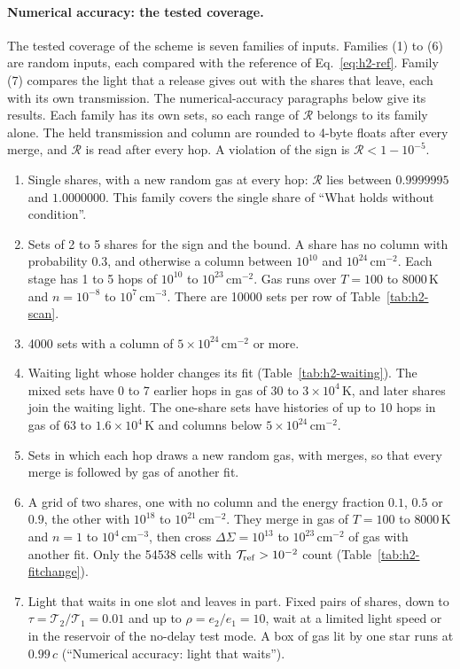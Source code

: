 \paragraph{Numerical accuracy: the tested coverage.} The tested coverage of the
scheme is seven families of inputs. Families (1) to (6) are random inputs,
each compared with the reference of Eq.~\eqref{eq:h2-ref}. Family (7)
compares the light that a release gives out with the shares that leave, each
with its own transmission. The numerical-accuracy paragraphs
below give its results. Each family has its own sets, so each range of
$\mathcal R$ belongs to its family alone. The held transmission and column are
rounded to 4-byte floats after every merge, and $\mathcal R$ is read after every
hop. A violation of the sign is $\mathcal R<1-10^{-5}$.
\begin{enumerate}[(1)]
  \item Single shares, with a new random gas at every hop: $\mathcal R$ lies
    between $0.9999995$ and $1.0000000$. This family covers the single share of
    ``What holds without condition''.
  \item Sets of 2 to 5 shares for the sign and the bound. A share has no column
    with probability 0.3, and otherwise a column between $10^{10}$ and
    $10^{24}$\,cm$^{-2}$. Each stage has 1 to 5 hops of $10^{10}$ to
    $10^{23}$\,cm$^{-2}$. Gas runs over $T=100$ to $8000$\,K and $n=10^{-8}$ to
    $10^{7}$\,cm$^{-3}$. There are 10000 sets per row of
    Table~\ref{tab:h2-scan}.
  \item 4000 sets with a column of $5\times10^{24}$\,cm$^{-2}$ or more.
  \item Waiting light whose holder changes its fit
    (Table~\ref{tab:h2-waiting}). The mixed sets have 0 to 7 earlier hops in
    gas of $30$ to $3\times10^{4}$\,K, and later shares join the waiting light.
    The one-share sets have histories of up to 10 hops in gas of $63$ to
    $1.6\times10^4$\,K and columns below $5\times10^{24}$\,cm$^{-2}$.
  \item Sets in which each hop draws a new random gas, with merges, so that
    every merge is followed by gas of another fit.
  \item A grid of two shares, one with no column and the energy fraction
    $0.1$, $0.5$ or $0.9$, the other with $10^{18}$ to $10^{21}$\,cm$^{-2}$.
    They merge in gas of $T=100$ to $8000$\,K and $n=1$ to
    $10^{4}$\,cm$^{-3}$, then cross $\Delta\Sigma=10^{13}$ to
    $10^{23}$\,cm$^{-2}$ of gas with another fit. Only the 54538 cells with
    $\mathcal T_{\rm ref}>10^{-2}$ count (Table~\ref{tab:h2-fitchange}).
  \item Light that waits in one slot and leaves in part. Fixed pairs of
    shares, down to $\tau=\mathcal T_2/\mathcal T_1=0.01$ and up to
    $\rho=e_2/e_1=10$, wait at a limited light speed or in the reservoir of
    the no-delay test mode. A box of gas lit by one star runs at $0.99\,c$
    (``Numerical accuracy: light that waits'').
\end{enumerate}

